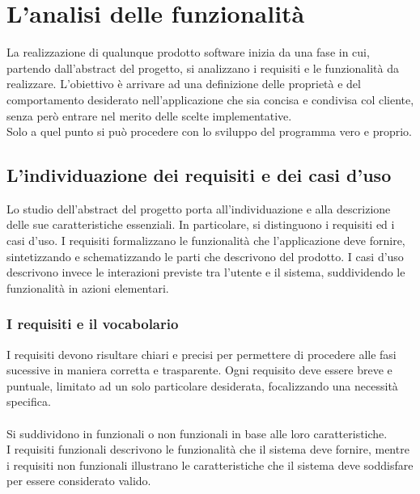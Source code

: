 \chapter{L'analisi delle funzionalità}

La realizzazione di qualunque prodotto software inizia da una fase in cui, 
partendo dall’abstract del progetto, si analizzano i requisiti e le funzionalità da realizzare.
L’obiettivo è arrivare ad una definizione delle proprietà e 
del comportamento desiderato nell’applicazione che sia concisa e condivisa col cliente,
senza però entrare nel merito delle scelte implementative.\\
Solo a quel punto si può procedere con lo sviluppo del programma vero e proprio.

\section{L'individuazione dei requisiti e dei casi d’uso}

Lo studio dell’abstract del progetto porta all’individuazione e 
alla descrizione delle sue caratteristiche essenziali.
In particolare, si distinguono i requisiti ed i casi d'uso.
I requisiti formalizzano le funzionalità che l'applicazione deve fornire, 
sintetizzando e schematizzando le parti che descrivono del prodotto.
I casi d'uso descrivono invece le interazioni previste tra l'utente e il sistema, 
suddividendo le funzionalità in azioni elementari.\\

\subsection{I requisiti e il vocabolario}
I requisiti devono risultare chiari e precisi per permettere di procedere alle fasi sucessive in maniera corretta e trasparente.
Ogni requisito deve essere breve e puntuale, limitato ad un solo particolare desiderata,
focalizzando una necessità specifica.\\
\\
Si suddividono in funzionali o non funzionali in base alle loro caratteristiche.\\
I requisiti funzionali descrivono le funzionalità che il sistema deve fornire,
mentre i requisiti non funzionali illustrano le caratteristiche che il sistema deve soddisfare per essere considerato valido.\\

